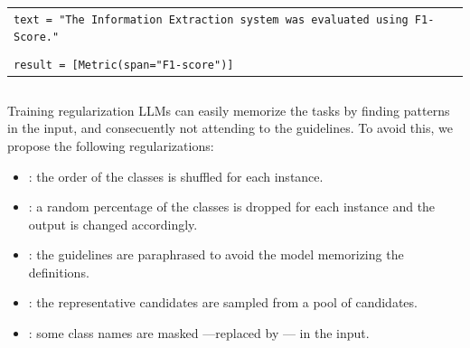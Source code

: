 \documentclass[
    11pt,
    notheorems,
    xcolor={dvipsnames},
    hyperref={
        pdfstartview=FitH, 
        pdftitle={Ikasketa-adibide urriko Informazio-Erauzketa}, 
        pdfauthor={Oscar Sainz Jimenez}, 
        citecolor=secondary, 
    }
]{beamer}
\begin{document}
\begin{frame}
\begin{columns}
\begin{column}{0.6\textwidth}
\begin{table}
\begin{tabular}{p{\textwidth}}
                    \texttt{text = \textcolor{github-blue}{"The Information Extraction system was evaluated using F1-Score."}}                                \\ \\
                    \texttt{result \textcolor{github-red}{=} [\textcolor{github-dark-red}{Metric}(span\textcolor{github-red}{=}\textcolor{github-blue}{"F1-score"})]} \\
                \end{tabular}
            \end{table}
        \end{column}
    \end{columns}
\end{frame}

\begin{frame}
    \begin{block}{Training regularization}
        LLMs can easily memorize the tasks by finding patterns in the input, and consecuently not attending to the guidelines. To avoid this, we propose the following regularizations:
        \begin{itemize}[<+->]
            \item {}: the order of the classes is shuffled for each instance.
            \item {}: a random percentage of the classes is dropped for each instance and the output is changed accordingly.
            \item {}: the guidelines are paraphrased to avoid the model memorizing the definitions.
            \item {}: the representative candidates are sampled from a pool of candidates.
            \item {}: some class names are masked ---replaced by --- in the input.
        \end{itemize}

    \end{block}
\end{frame}

\end{document}
